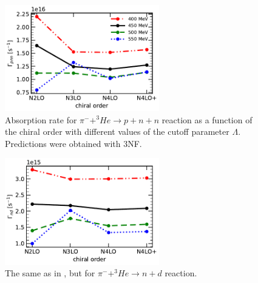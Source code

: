     \begin{figure}[h]
        \begin{center}
        \includegraphics[width=0.6\textwidth]{PlotData/PION/Dalitz_maps/figures/Gamma_pnn.pdf}
        \end{center}
        \caption{Absorption rate for $\pi^- + ^3He \rightarrow p + n + n$ reaction as a function
        of the chiral order with different values of the cutoff parameter $\Lambda$.
        Predictions were obtained with 3NF.}
        \label{Gamma_pnn}
    \end{figure}

    \begin{figure}[h]
        \begin{center}
        \includegraphics[width=0.6\textwidth]{PlotData/PION/Dalitz_maps/figures/Gamma_nd.pdf}
        \end{center}
        \caption{The same as in , but for $\pi^- + ^3He \rightarrow n + d$ reaction.}
        \label{Gamma_nd}
    \end{figure}

